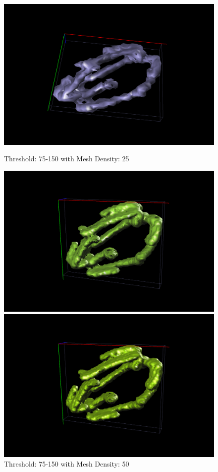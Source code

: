 \documentclass{article}
\begin{document}
\begin{figure}[ht]
  \centering
  \begin{minipage}[b]{0.5\linewidth}
    \centering
    \includegraphics[width=.8\linewidth]{Report/Images/6.3.2/75-150_25.png}
    \captionsetup{width=.8\linewidth}
    \caption{Threshold: 75-150 with Mesh Density: 25}
    \label{fig:75150_25}
    \vspace{4ex}
  \end{minipage}%
  \begin{minipage}[b]{0.5\linewidth}
    \centering
    \includegraphics[width=.8\linewidth]{Report/Images/6.3.2/75-150_50.png}
    \captionsetup{width=.8\linewidth}
    \caption{Threshold: 75-150 with Mesh Density: 50}
    \label{fig:75150_50}
    \vspace{4ex}
  \end{minipage} 
  \begin{minipage}[b]{0.5\linewidth}
    \centering
    \includegraphics[width=.8\linewidth]{Report/Images/6.3.2/75-150_75.png}

\end{minipage}
\end{figure}
\end{document}
